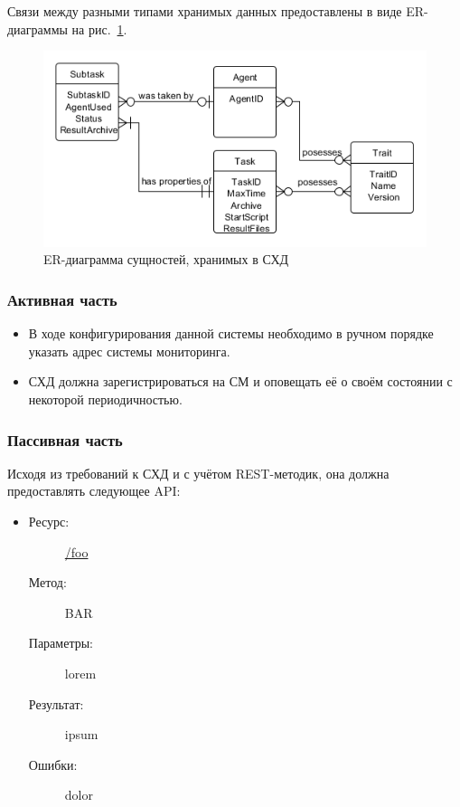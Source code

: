 \documentclass[a4paper,12pt]{report}
\numberwithin{equation}{section}
\begin{document}
Связи между разными типами хранимых данных предоставлены в виде ER-диаграммы на рис.~\ref{fig:db-er}.

\begin{figure}
  \centering
  \includegraphics[width=.9\linewidth]{diagrams/db/er}
  \caption{ER-диаграмма сущностей, хранимых в СХД}
  \label{fig:db-er}
\end{figure}

\subsubsection{Активная часть}
\begin{itemize}
  \item В ходе конфигурирования данной системы необходимо в ручном порядке указать адрес системы мониторинга.
  \item СХД должна зарегистрироваться на СМ и оповещать её о своём состоянии с некоторой периодичностью.
\end{itemize}

\subsubsection{Пассивная часть}
Исходя из требований к СХД и с учётом REST-методик, она должна предоставлять следующее API:

\begin{itemize}
  \item
  \begin{description}
    \item[Ресурс:] \url{/foo}
    \item[Метод:] BAR
    \item[Параметры:] lorem
    \item[Результат:] ipsum
    \item[Ошибки:] dolor
  \end{description}
\end{itemize}
\end{document}
